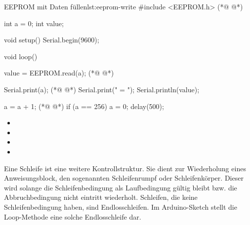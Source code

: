 \begin{multicols}{2}
\begin{arduinoCode}{EEPROM mit Daten füllen}{lst:eeprom-write}
#include <EEPROM.h> (*@  @*) 

int a = 0;
int value;

void setup() {
  Serial.begin(9600);
}

void loop() {
  value = EEPROM.read(a); (*@  @*) 

  Serial.print(a); (*@  @*) 
  Serial.print(" = ");
  Serial.println(value);
  
  a = a + 1; (*@  @*) 
  if (a == 256) {
    a = 0;
  }
  delay(500);
}
\end{arduinoCode}

\vfill
\columnbreak

\null\vfill
\begin{itemize}
  \itemsep15pt
  \item[] 
  \item[] 
  \item[] 
  \item[] 
\end{itemize}
\vfill \null


\end{multicols}


Eine Schleife ist eine weitere Kontrollstruktur. Sie dient zur Wiederholung eines Anweisungsblock, den sogenannten Schleifenrumpf oder Schleifenkörper. Dieser wird solange die Schleifenbedingung als Laufbedingung gültig bleibt bzw. die Abbruchbedingung nicht eintritt wiederholt. Schleifen, die keine Schleifenbedingung haben, sind Endlosschleifen. Im Arduino-Sketch stellt die Loop-Methode eine solche Endlosschleife dar.

